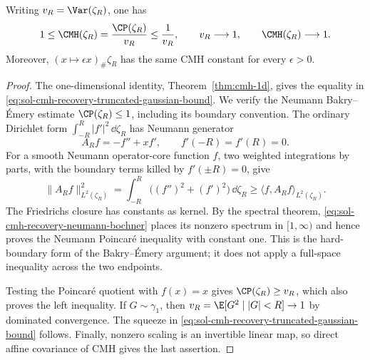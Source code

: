 \documentclass[../main.tex]{subfiles}
\begin{document}
\begin{lemma}
\label{lem:sol-cmh-recovery-truncated-gaussian}
Writing $v_R=\Var(\zeta_R)$, one has
\begin{equation}
  1\le\CMH(\zeta_R)
  =\frac{\CP(\zeta_R)}{v_R}
  \le\frac1{v_R},
  \qquad
  v_R\longrightarrow1,
  \qquad
  \CMH(\zeta_R)\longrightarrow1.
  \label{eq:sol-cmh-recovery-truncated-gaussian-bound}
\end{equation}
Moreover, $(x\mapsto\epsilon x)_\#\zeta_R$ has the same CMH constant for every $\epsilon>0$.
\end{lemma}

\begin{proof}
The one-dimensional identity, Theorem~\ref{thm:cmh-1d}, gives the equality in
\eqref{eq:sol-cmh-recovery-truncated-gaussian-bound}.  We verify the Neumann
Bakry--\'Emery estimate $\CP(\zeta_R)\le1$, including its boundary convention.  The ordinary
Dirichlet form $\int_{-R}^R|f'|^2\,\dd\zeta_R$ has Neumann generator
\[
  A_Rf=-f''+xf',
  \qquad f'(-R)=f'(R)=0.
\]
For a smooth Neumann operator-core function $f$, two weighted integrations by parts, with the
boundary terms killed by $f'(\pm R)=0$, give
\begin{equation}
  \lVert A_Rf\rVert_{L^2(\zeta_R)}^2
  =\int_{-R}^R\bigl((f'')^2+(f')^2\bigr)\,\dd\zeta_R
  \ge\langle f,A_Rf\rangle_{L^2(\zeta_R)}.
  \label{eq:sol-cmh-recovery-neumann-bochner}
\end{equation}
The Friedrichs closure has constants as kernel.  By the spectral theorem,
\eqref{eq:sol-cmh-recovery-neumann-bochner} places its nonzero spectrum in $[1,\infty)$ and
hence proves the Neumann Poincar\'e inequality with constant one.  This is the hard-boundary
form of the Bakry--\'Emery argument; it does not apply a full-space inequality across the two
endpoints.

Testing the Poincar\'e quotient with $f(x)=x$ gives $\CP(\zeta_R)\ge v_R$, which also proves
the left inequality.  If $G\sim\gamma_1$, then
$v_R=\E[G^2\mid |G|<R]\to1$ by dominated convergence.  The squeeze in
\eqref{eq:sol-cmh-recovery-truncated-gaussian-bound} follows.  Finally, nonzero scaling is an
invertible linear map, so direct affine covariance of CMH gives the last assertion.
\end{proof}
\end{document}
